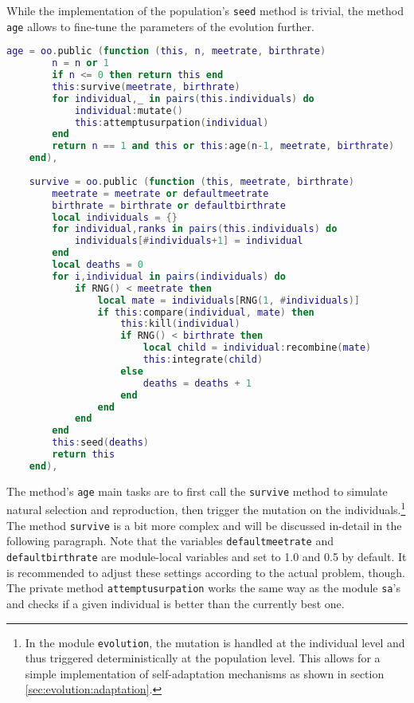 While the implementation of the population's \texttt{seed} method is trivial, the method \texttt{age} allows to fine-tune the parameters of the evolution further.

\begin{lstlisting}[language=lua, caption={Definition of the methods \texttt{age} and \texttt{survive} of \texttt{evolution.population} (inside a template table passed to \texttt{object:intend})}, label=lst:generation, name=lst:generation]
	age = oo.public (function (this, n, meetrate, birthrate)
		n = n or 1
		if n <= 0 then return this end
		this:survive(meetrate, birthrate)
		for individual,_ in pairs(this.individuals) do
			individual:mutate()
			this:attemptusurpation(individual)
		end
		return n == 1 and this or this:age(n-1, meetrate, birthrate)
	end),
	
	survive = oo.public (function (this, meetrate, birthrate)
		meetrate = meetrate or defaultmeetrate
		birthrate = birthrate or defaultbirthrate
		local individuals = {}
		for individual,ranks in pairs(this.individuals) do
			individuals[#individuals+1] = individual
		end
		local deaths = 0
		for i,individual in pairs(individuals) do
			if RNG() < meetrate then
				local mate = individuals[RNG(1, #individuals)]
				if this:compare(individual, mate) then
					this:kill(individual)
					if RNG() < birthrate then
						local child = individual:recombine(mate)
						this:integrate(child)
					else
						deaths = deaths + 1
					end
				end
			end
		end
		this:seed(deaths)
		return this
	end),
\end{lstlisting}

The method's \texttt{age} main tasks are to first call the \texttt{survive} method to simulate natural selection and reproduction, then trigger the mutation on the individuals.\footnote{In the module \texttt{evolution}, the mutation is handled at the individual level and thus triggered deterministically at the population level. This allows for a simple implementation of self-adaptation mechanisms as shown in section \ref{sec:evolution:adaptation}.} The method \texttt{survive} is a bit more complex and will be discussed in-detail in the following paragraph. Note that the variables \texttt{defaultmeetrate} and \texttt{defaultbirthrate} are module-local variables and set to 1.0 and 0.5 by default. It is recommended to adjust these settings according to the actual problem, though. The private method \texttt{attemptusurpation} works the same way as the module \texttt{sa}'s and checks if a given individual is better than the currently best one.

